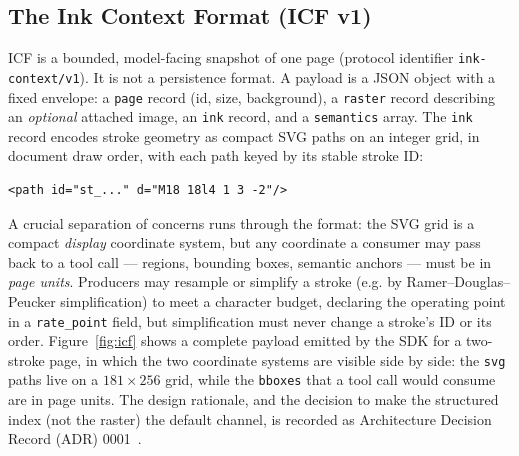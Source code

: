 \documentclass[11pt]{article}
\newcommand{\code}[1]{\texttt{#1}}
\begin{document}
\subsection{The Ink Context Format (ICF v1)}
ICF is a bounded, model-facing snapshot of one page (protocol identifier
\code{ink-context/v1}). It is not a persistence format. A payload is a JSON
object with a fixed envelope: a \code{page} record (id, size, background), a
\code{raster} record describing an \emph{optional} attached image, an \code{ink}
record, and a \code{semantics} array. The \code{ink} record encodes stroke
geometry as compact SVG paths on an integer grid, in document draw order, with
each path keyed by its stable stroke ID:

\begin{lstlisting}
<path id="st_..." d="M18 18l4 1 3 -2"/>
\end{lstlisting}

A crucial separation of concerns runs through the format: the SVG grid is a
compact \emph{display} coordinate system, but any coordinate a consumer may pass
back to a tool call --- regions, bounding boxes, semantic anchors --- must be in
\emph{page units}. Producers may resample or simplify a stroke (e.g. by
Ramer--Douglas--Peucker simplification) to meet a character budget, declaring the
operating point in a \code{rate\_point} field, but simplification must never
change a stroke's ID or its order. Figure~\ref{fig:icf} shows a complete payload
emitted by the SDK for a two-stroke page, in which the two coordinate systems are
visible side by side: the \code{svg} paths live on a $181\times256$ grid, while
the \code{bboxes} that a tool call would consume are in page units. The design
rationale, and the decision to make the structured index (not the raster) the
default channel, is recorded as Architecture Decision Record (ADR)
0001~\cite{adr1}.
\end{document}
